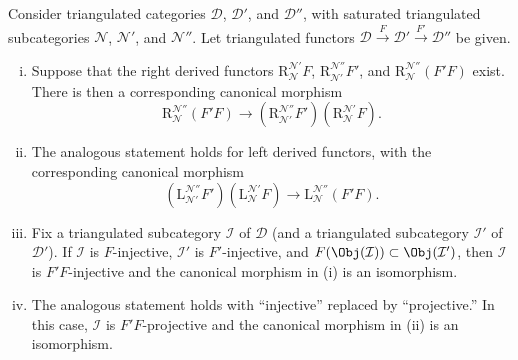 \begin{theorem}\label{prop:localization-triangulated-composite}
	Consider triangulated categories $\mathcal{D}$, $\mathcal{D}'$, and
	$\mathcal{D}''$, with saturated triangulated subcategories
	$\mathcal{N}$, $\mathcal{N}'$, and $\mathcal{N}''$. Let triangulated
	functors
	$\mathcal{D}\xrightarrow{F}\mathcal{D}'\xrightarrow{F'}\mathcal{D}''$
	be given.
	\begin{enumerate}[(i)]
		\item Suppose that the right derived functors
		$\mathrm{R}^{\mathcal{N}'}_{\mathcal{N}}F$,
		$\mathrm{R}^{\mathcal{N}''}_{\mathcal{N}'}F'$, and
		$\mathrm{R}^{\mathcal{N}''}_{\mathcal{N}}(F'F)$ exist. There is then a
		corresponding canonical morphism
		\[ \mathrm{R}^{\mathcal{N}''}_{\mathcal{N}} (F' F) \to \left( \mathrm{R}^{\mathcal{N}''}_{\mathcal{N}'} F' \right) \left( \mathrm{R}^{\mathcal{N}'}_{\mathcal{N}} F \right). \]
		\item The analogous statement holds for left derived functors, with the
		corresponding canonical morphism
		\[ \left( \mathrm{L}^{\mathcal{N}''}_{\mathcal{N'}} F' \right) \left( \mathrm{L}^{\mathcal{N}'}_{\mathcal{N}} F \right) \to \mathrm{L}^{\mathcal{N}''}_{\mathcal{N}} (F' F). \]
		\item Fix a triangulated subcategory $\mathcal{I}$ of $\mathcal{D}$
		(and a triangulated subcategory $\mathcal{I}'$ of $\mathcal{D}'$). If
		$\mathcal{I}$ is $F$-injective, $\mathcal{I}'$ is $F'$-injective, and
		$F(\Obj(\mathcal{I}))\subset\Obj(\mathcal{I}')$, then $\mathcal{I}$ is
		$F'F$-injective and the canonical morphism in (i) is an isomorphism.
		\item The analogous statement holds with ``injective'' replaced by
		``projective.'' In this case, $\mathcal{I}$ is $F'F$-projective and the
		canonical morphism in (ii) is an isomorphism.
	\end{enumerate}
\end{theorem}
